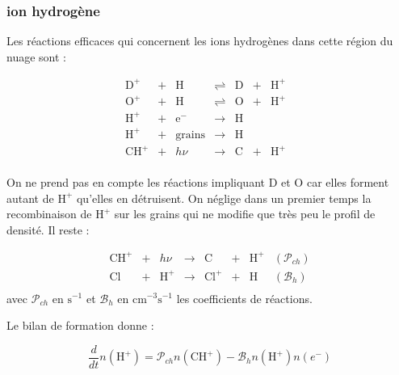 \subsubsection{ion hydrogène}

Les réactions efficaces qui concernent les ions hydrogènes dans cette région du nuage sont : 

\begin{equation}\label{eq:sysH}
    \begin{array}{lllllllr}
        \mathrm{D}^+ & + &\mathrm{H}   & \rightleftharpoons &\mathrm{D}  & + & \mathrm{H}^+ &   \\
        \mathrm{O}^+ & + &\mathrm{H}   & \rightleftharpoons &\mathrm{O}  & + & \mathrm{H}^+ &   \\
        \mathrm{H}^+  & + & \mathrm{e}^-  & \rightarrow &\mathrm{H}   &   &  &  \\
        \mathrm{H}^+  & + & \mathrm{grains}  & \rightarrow &\mathrm{H}   &   &  &  \\
        \mathrm{CH}^+ & + & h\nu   & \rightarrow &\mathrm{C}  & + & \mathrm{H}^+ &  \\
    \end{array}
\end{equation}

On ne prend pas en compte les réactions impliquant $\mathrm{D}$ et $\mathrm{O}$ car elles forment autant de $\mathrm{H}^+$ qu'elles en détruisent. On néglige dans un premier temps la recombinaison de $\mathrm{H}^+$ sur les grains qui ne modifie que très peu le profil de densité. Il reste :

\begin{equation}
    \begin{array}{lllllllr}
        \mathrm{CH}^+ & + & h\nu   & \rightarrow &\mathrm{C}  & + & \mathrm{H}^+ & (\mathcal{P}_{ch}) \\
        \mathrm{Cl}  & + & \mathrm{H}^+  & \rightarrow & \mathrm{Cl}^+ & + &\mathrm{H}  & (\mathcal{B}_h) \\
    \end{array}
\end{equation}
avec $\mathcal{P}_{ch}$ en $\mathrm{s}^{-1}$ et $\mathcal{B}_h$ en $\mathrm{cm}^{-3}\mathrm{s}^{-1}$ les coefficients de réactions.

Le bilan de formation donne : 

\begin{equation}
    \frac{d}{dt}n(\mathrm{H}^+) = \mathcal{P}_{ch}n(\mathrm{CH}^+) - \mathcal{B}_{h}n(\mathrm{H}^+)n(e^-)
\end{equation}

